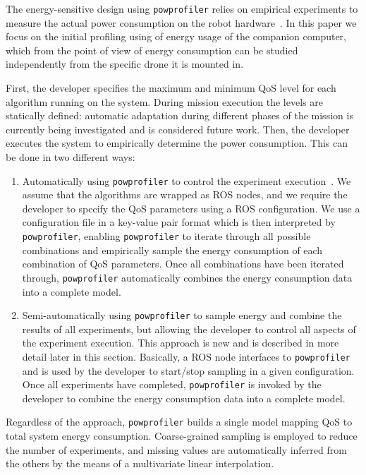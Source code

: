 \documentclass[conference]{IEEEtran}
\newcommand{\stt}[1]{{\small\tt #1}} %
\newcommand{\powprof}{\stt{powprofiler}}
\begin{document}
The energy-sensitive design using \powprof{} relies on empirical
experiments to measure the actual power consumption on the robot
hardware~\cite{seewald2019coarse}. In this paper we focus on the
initial profiling using of energy usage of the companion computer,
which from the point of view of energy consumption
can be studied independently from the specific drone it is mounted in.


First, the developer specifies the maximum and minimum QoS level for
each algorithm running on the system.  During mission execution the
levels are statically defined: automatic adaptation during different
phases of the mission is currently being investigated and is
considered future work.
%
Then, the developer executes the system to empirically determine the
power consumption. This can be done in two different ways:
%
\begin{enumerate}
\item Automatically using \powprof{} to control the experiment
  execution~\cite{seewald2019coarse}. We assume that the algorithms
  are wrapped as ROS nodes, and we require the developer to specify
  the QoS parameters using a ROS configuration. We use a configuration
  file in a key-value pair format which is then interpreted by
  \powprof{}, enabling \powprof{} to iterate through all possible
  combinations and empirically sample the energy consumption of each
  combination of QoS parameters. Once all combinations have been
  iterated through, \powprof{} automatically combines the energy
  consumption data into a complete model.
\item Semi-automatically using \powprof{} to sample energy and combine
  the results of all experiments, but allowing the developer to
  control all aspects of the experiment execution. This approach is
  new and is described in more detail later in this
  section. Basically, a ROS node interfaces to \powprof{} and is used
  by the developer to start/stop sampling in a given
  configuration. Once all experiments have completed, \powprof{} is
  invoked by the developer to combine the energy consumption data into
  a complete model.


\end{enumerate}
%
Regardless of the approach, \powprof{} builds a single model mapping
QoS to total system energy consumption. Coarse-grained sampling is
employed to reduce the number of experiments, and missing values are
automatically inferred from the others by the means of a multivariate
linear interpolation.
\end{document}
